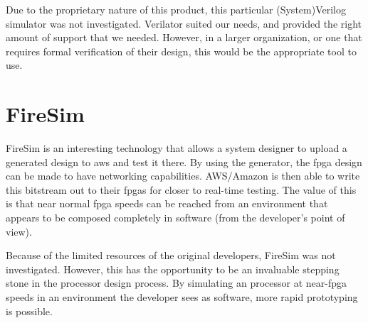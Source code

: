Due to the proprietary nature of this product, this particular (System)Verilog simulator was not investigated.
Verilator suited our needs, and provided the right amount of support that we needed.
However, in a larger organization, or one that requires formal verification of their design, this would be the appropriate tool to use.

\section{FireSim}\label{sec:FireSim_Simulator}
\nocite{firesimPresentation}
FireSim is an interesting technology that allows a system designer to upload a generated design to \Gls{aws} and test it there.
By using the  generator, the \gls{fpga} design can be made to have networking capabilities.
AWS/Amazon is then able to write this bitstream out to their \glspl{fpga} for closer to real-time testing.
The value of this is that near normal \gls{fpga} speeds can be reached from an environment that appears to be composed completely in software (from the developer's point of view).

Because of the limited resources of the original developers, FireSim was not investigated.
However, this has the opportunity to be an invaluable stepping stone in the processor design process.
By simulating an processor at near-\gls{fpga} speeds in an environment the developer sees as software, more rapid prototyping is possible.


